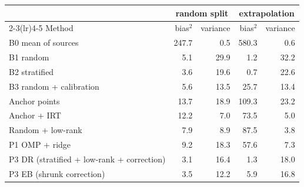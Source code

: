 {\scriptsize
\begin{tabular}{lrrrr}
\toprule
 & \multicolumn{2}{c}{random split} & \multicolumn{2}{c}{extrapolation} \\
\cmidrule(lr){2-3}\cmidrule(lr){4-5}
Method & bias$^2$ & variance & bias$^2$ & variance \\
\midrule
B0 mean of sources & 247.7 & 0.5 & 580.3 & 0.6 \\
B1 random & 5.1 & 29.9 & 1.2 & 32.2 \\
B2 stratified & 3.6 & 19.6 & 0.7 & 22.6 \\
B3 random + calibration & 5.6 & 13.5 & 25.7 & 13.4 \\
Anchor points & 13.7 & 18.9 & 109.3 & 23.2 \\
Anchor + IRT & 12.2 & 7.0 & 73.5 & 5.0 \\
Random + low-rank & 7.9 & 8.9 & 87.5 & 3.8 \\
P1 OMP + ridge & 9.2 & 18.3 & 57.6 & 7.3 \\
P3 DR (stratified + low-rank + correction) & 3.1 & 16.4 & 1.3 & 18.0 \\
P3 EB (shrunk correction) & 3.5 & 12.2 & 5.9 & 16.8 \\
\bottomrule
\end{tabular}}
